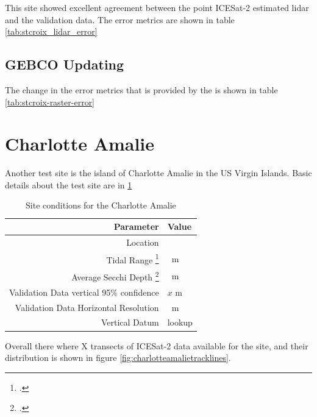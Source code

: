 This site showed excellent agreement between the point ICESat-2 estimated lidar and the validation data. The error metrics are shown in table \ref{tab:stcroix_lidar_error}



\subsection{GEBCO Updating}

The change in the error metrics that is provided by the  is shown in table \ref{tab:stcroix-raster-error}



\section{Charlotte Amalie}
Another test site is the island of Charlotte Amalie in the US Virgin Islands. Basic details about the test site are in \ref{table:charlotteamalie_datatable}
\begin{table}[h]
    \begin{minipage}{0.5\textwidth}
        \centering\begin{tabular}{r l }
            Parameter                                                 & \textbf{Value} \\
            \hline
            Location                                                  &                \\
            Tidal Range \footcite{Tidal_data_reanalysis2022}          & \qty{}{m}      \\
            Average Secchi Depth \footcite{ACRI-STGlobColourTeam2020} & \qty{}{m}      \\
            Validation Data vertical 95\% confidence                  & $x$ m          \\
            Validation Data Horizontal Resolution                     & \qty{}{m}      \\
            Vertical Datum                                            & lookup         \\
        \end{tabular}
    \end{minipage}
    \caption{Site conditions for the Charlotte Amalie}
    \label{table:charlotteamalie_datatable}
\end{table}
Overall there where X  transects of ICESat-2 data available for the site, and their distribution is shown in figure \ref{fig:charlotteamalietracklines}.


